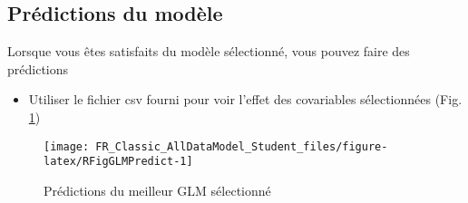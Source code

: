 \documentclass[french,a4paper]{article}
\providecommand{\tightlist}{%
  \setlength{\itemsep}{0pt}\setlength{\parskip}{0pt}}
\begin{document}
\hypertarget{predictions-du-modele}{%
\subsection{Prédictions du modèle}\label{predictions-du-modele}}

Lorsque vous êtes satisfaits du modèle sélectionné, vous pouvez faire des prédictions

\begin{itemize}
\tightlist
\item
  Utiliser le fichier csv fourni pour voir l'effet des covariables sélectionnées (Fig. \ref{fig:RFigGLMPredict})
\end{itemize}



\begin{figure}[!h]

{\centering \texttt{[image: FR\_Classic\_AllDataModel\_Student\_files/figure-latex/RFigGLMPredict-1]} 

}

\caption{Prédictions du meilleur GLM sélectionné}\label{fig:RFigGLMPredict}
\end{figure}
\end{document}
